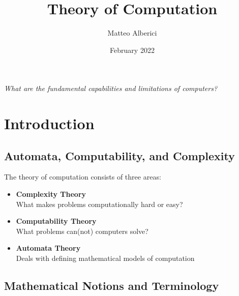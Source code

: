 \documentclass{article}
\title{Theory of Computation}
\author{Matteo Alberici}
\date{February 2022}
\begin{document}
\maketitle
\vspace{2cm}
\noindent
\large\textit{What are the fundamental capabilities and limitations of computers?}
\newpage
\tableofcontents
\newpage

\section{Introduction}
\subsection{Automata, Computability, and Complexity}
The theory of computation consists of three areas: 
\begin{itemize}
    \item \textbf{Complexity Theory}
        \vspace{0.2cm} \\
        What makes problems computationally hard or easy?
    \item \textbf{Computability Theory}
        \vspace{0.2cm} \\
        What problems can(not) computers solve?
    \item \textbf{Automata Theory}
        \vspace{0.2cm} \\
        Deals with defining mathematical models of computation
\end{itemize}
\subsection{Mathematical Notions and Terminology}
\end{document}

